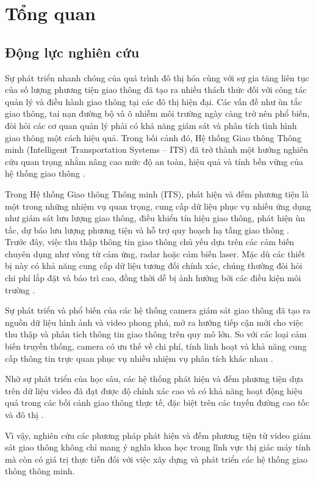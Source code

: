 \section{Tổng quan}
\subsection{Động lực nghiên cứu}

Sự phát triển nhanh chóng của quá trình đô thị hóa cùng với sự gia tăng liên
tục của số lượng phương tiện giao thông đã tạo ra nhiều thách thức đối với công
tác quản lý và điều hành giao thông tại các đô thị hiện đại. Các vấn đề như ùn
tắc giao thông, tai nạn đường bộ và ô nhiễm môi trường ngày càng trở nên phổ
biến, đòi hỏi các cơ quan quản lý phải có khả năng giám sát và phân tích tình
hình giao thông một cách hiệu quả. Trong bối cảnh đó, Hệ thống Giao thông Thông
minh (Intelligent Transportation Systems -- ITS) đã trở thành một hướng nghiên
cứu quan trọng nhằm nâng cao mức độ an toàn, hiệu quả và tính bền vững của hệ
thống giao thông \cite{YANG2018143}.

Trong Hệ thống Giao thông Thông minh (ITS), phát hiện và đếm phương tiện là một
trong những nhiệm vụ quan trọng, cung cấp dữ liệu phục vụ nhiều ứng dụng như
giám sát lưu lượng giao thông, điều khiển tín hiệu giao thông, phát hiện ùn
tắc, dự báo lưu lượng phương tiện và hỗ trợ quy hoạch hạ tầng giao thông
\cite{YANG2018143}. Trước đây, việc thu thập thông tin giao thông chủ yếu
dựa trên các cảm biến chuyên dụng như vòng từ cảm ứng, radar hoặc cảm biến
laser. Mặc dù các thiết bị này có khả năng cung cấp dữ liệu tương đối chính
xác, chúng thường đòi hỏi chi phí lắp đặt và bảo trì cao, đồng thời dễ bị ảnh
hưởng bởi các điều kiện môi trường \cite{YANG2018143}.

Sự phát triển và phổ biến của các hệ thống camera giám sát giao thông đã tạo ra
nguồn dữ liệu hình ảnh và video phong phú, mở ra hướng tiếp cận mới cho việc
thu thập và phân tích thông tin giao thông trên quy mô lớn. So với các loại cảm
biến truyền thống, camera có ưu thế về chi phí, tính linh hoạt và khả năng cung
cấp thông tin trực quan phục vụ nhiều nhiệm vụ phân tích khác nhau
\cite{YANG2018143}.

Nhờ sự phát triển của học sâu, các hệ thống phát hiện và đếm phương tiện dựa
trên dữ liệu video đã đạt được độ chính xác cao và có khả năng hoạt động hiệu
quả trong các bối cảnh giao thông thực tế, đặc biệt trên các tuyến đường cao
tốc và đô thị \cite{song2019}.

Vì vậy, nghiên cứu các phương pháp phát hiện và đếm phương tiện từ video giám
sát giao thông không chỉ mang ý nghĩa khoa học trong lĩnh vực thị giác máy tính
mà còn có giá trị thực tiễn đối với việc xây dựng và phát triển các hệ thống
giao thông thông minh.

